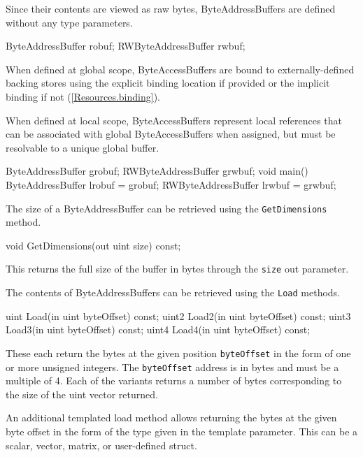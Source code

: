 
Since their contents are viewed as raw bytes, ByteAddressBuffers are defined without any type parameters.
\begin{HLSL}
  ByteAddressBuffer robuf;
  RWByteAddressBuffer rwbuf;
\end{HLSL}

When defined at global scope, ByteAccessBuffers are bound to externally-defined backing stores
using the explicit binding location if provided or the implicit binding if not (\ref{Resources.binding}).

When defined at local scope, ByteAccessBuffers represent local references
that can be associated with global ByteAccessBuffers when assigned,
but must be resolvable to a unique global buffer.

\begin{HLSL}
  ByteAddressBuffer grobuf;
  RWByteAddressBuffer grwbuf;
  void main() {
    ByteAddressBuffer lrobuf = grobuf;
    RWByteAddressBuffer lrwbuf = grwbuf;
  }
\end{HLSL}


The size of a ByteAddressBuffer can be retrieved using the \texttt{GetDimensions} method.
\begin{HLSL}
void GetDimensions(out uint size) const;
\end{HLSL}

This returns the full size of the buffer in bytes through the \texttt{size} out parameter.


The contents of ByteAddressBuffers can be retrieved using the \texttt{Load} methods.

\begin{HLSL}
 uint Load(in uint byteOffset) const;
 uint2 Load2(in uint byteOffset) const;
 uint3 Load3(in uint byteOffset) const;
 uint4 Load4(in uint byteOffset) const;
\end{HLSL}

These each return the bytes at the given position \texttt{byteOffset} in the form of one or more unsigned integers.
The \texttt{byteOffset} address is in bytes and must be a multiple of 4.
Each of the variants returns a number of bytes corresponding to the size of the uint vector returned.

An additional templated load method allows returning the bytes at the given byte offset in the form
of the type given in the template parameter. This can be a scalar, vector, matrix, or user-defined struct.

